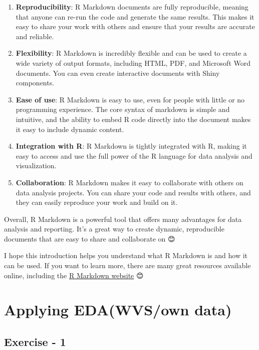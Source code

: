 \documentclass[
]{book}
\begin{document}
\begin{enumerate}
\def\labelenumi{\arabic{enumi}.}
\item
  \textbf{Reproducibility}: R Markdown documents are fully reproducible, meaning that anyone can re-run the code and generate the same results. This makes it easy to share your work with others and ensure that your results are accurate and reliable.
\item
  \textbf{Flexibility}: R Markdown is incredibly flexible and can be used to create a wide variety of output formats, including HTML, PDF, and Microsoft Word documents. You can even create interactive documents with Shiny components.
\item
  \textbf{Ease of use}: R Markdown is easy to use, even for people with little or no programming experience. The core syntax of markdown is simple and intuitive, and the ability to embed R code directly into the document makes it easy to include dynamic content.
\item
  \textbf{Integration with R}: R Markdown is tightly integrated with R, making it easy to access and use the full power of the R language for data analysis and visualization.
\item
  \textbf{Collaboration}: R Markdown makes it easy to collaborate with others on data analysis projects. You can share your code and results with others, and they can easily reproduce your work and build on it.
\end{enumerate}

Overall, R Markdown is a powerful tool that offers many advantages for data analysis and reporting. It's a great way to create dynamic, reproducible documents that are easy to share and collaborate on 😊

I hope this introduction helps you understand what R Markdown is and how it can be used. If you want to learn more, there are many great resources available online, including the \href{https://bookdown.org/yihui/rmarkdown/}{R Markdown website} 😊

\hypertarget{applying-edawvsown-data}{%
\section{Applying EDA(WVS/own data)}\label{applying-edawvsown-data}}

\hypertarget{exercise---1}{%
\subsection{Exercise - 1}\label{exercise---1}}
\end{document}
